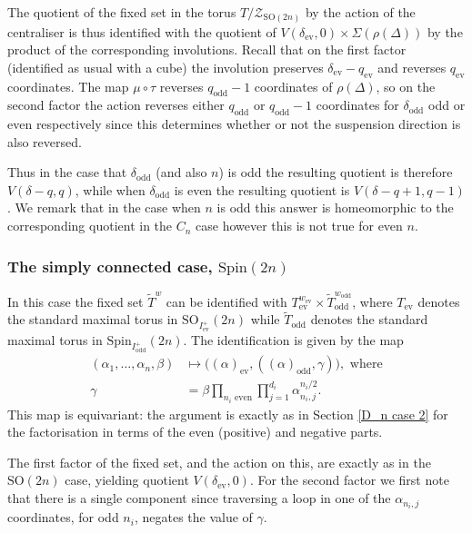 \documentclass[11pt,a4paper]{article}
\def\Spin{\mathrm{Spin}}
\def\SO{\mathrm{SO}}
\def\cZ{\mathcal{Z}}
\def\cZ{{\mathcal Z}}
\def\coveringtorus{\tilde{T}}
\def\ev{\mathrm{ev}}
\def\odd{\mathrm{odd}}
\def\ZDSO{\cZ_{\SO(2n)}}
\begin{document}
The quotient of the fixed set in the torus $T/\ZDSO$ by the action of the centraliser is thus identified with the quotient of $V(\delta_\ev,0)\times\Sigma(\rho(\Delta))$ by the product of the corresponding involutions.  Recall that on the first factor (identified as usual with a cube) the involution preserves $\delta_\ev-q_\ev$ and reverses $q_\ev$ coordinates. The map $\mu\circ\tau$ reverses $q_\odd-1$ coordinates of $\rho(\Delta)$, so on the second factor the action reverses either $q_\odd$ or $q_\odd-1$ coordinates for ${\delta_\odd}$ odd or even respectively since this determines whether or not the suspension direction is also reversed.


Thus in the case that ${\delta_\odd}$ (and also $n$) is odd the resulting quotient is therefore  $V(\delta-q,q)$, while when ${\delta_\odd}$ is even the resulting quotient is $V(\delta-q+1,q-1)$. We remark that in the case when $n$ is odd this answer is homeomorphic to the corresponding quotient in the $C_n$ case however this is  not true for even $n$.



\subsubsection{The simply connected case, $\Spin(2n)$} 

In this case the fixed set $\coveringtorus^w$ can be identified with $T_\ev^{w_{\ev}}\times \coveringtorus^{w_\odd}_\odd$, where $T_\ev$ denotes the standard maximal torus in $\SO_{I^+_{\ev}}(2n)$ while $\coveringtorus_\odd$ denotes the standard maximal torus in $\Spin_{I^+_\odd}(2n)$. The identification is given by the map
\begin{align*}
(\alpha_1,\dots,\alpha_n,\beta) &\mapsto \big((\alpha)_{\ev},((\alpha)_\odd,\gamma)\big), \text{ where}\\
\gamma&=\beta\prod_{n_i\text{ even}}\prod_{j=1}^{d_i}\alpha_{n_i,j}^{n_i/2}.
\end{align*}
This map is equivariant: the argument is exactly as in Section \ref{D_n case 2} for the factorisation in terms of the even (positive) and negative parts.





The first factor of the fixed set, and the action on this, are exactly as in the $\SO(2n)$ case, yielding quotient $V(\delta_\ev,0)$. For the second factor we first note that there is a single component since traversing a loop in one of the $\alpha_{n_i,j}$ coordinates, for odd $n_i$, negates the value of $\gamma$.
\end{document}
